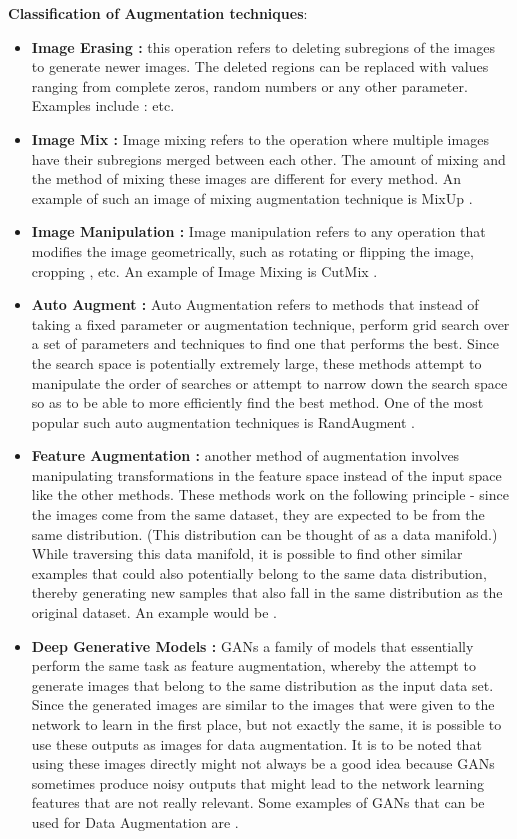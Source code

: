 \textbf{Classification of Augmentation techniques}:
\begin{itemize}
\item \textbf{Image Erasing :} this operation refers to deleting subregions of the images to generate newer images. The deleted regions can be replaced with values ranging from complete zeros, random numbers or any other parameter. Examples include : \cite{zhongRandomErasingData2020,chenGridMaskDataAugmentation2020,singhHideandSeekDataAugmentation2018} etc.
\item \textbf{Image Mix :} Image mixing refers to the operation where multiple images have their subregions merged between each other. The amount of mixing and the method of mixing these images are different for every method. An example of such an image of mixing augmentation technique is MixUp \cite{zhangMixupEmpiricalRisk2018}.
\item \textbf{Image Manipulation :} Image manipulation refers to any operation that modifies the image geometrically, such as rotating or flipping the image, cropping , etc. An example of Image Mixing is CutMix \cite{yunCutMixRegularizationStrategy2019a}.
\item \textbf{Auto Augment :} Auto Augmentation refers to methods that instead of taking a fixed parameter or augmentation technique, perform grid search over a set of parameters and techniques to find one that performs the best. Since the search space is potentially extremely large, these methods attempt to manipulate the order of searches or attempt to narrow down the search space so as to be able to more efficiently find the best method. One of the most popular such auto augmentation techniques is RandAugment \cite{cubukRandaugmentPracticalAutomated2020}.
\item \textbf{Feature Augmentation :} another method of augmentation involves manipulating transformations in the feature space instead of the input space like the other methods. These methods work on the following principle - since the images come from the same dataset, they are expected to be from the same distribution. (This distribution can be thought of as a data manifold.) While traversing this data manifold, it is possible to find other similar examples that could also potentially belong to the same data distribution, thereby generating new samples that also fall in the same distribution as the original dataset. An example would be \cite{devriesImprovedRegularizationConvolutional2017}.
\item \textbf{Deep Generative Models :} GANs a family of models that essentially perform the same task as feature augmentation, whereby the attempt to generate images that belong to the same distribution as the input data set. Since the generated images are similar to the images that were given to the network to learn in the first place, but not exactly the same, it is possible to use these outputs as images for data augmentation. It is to be noted that using these images directly might not always be a good idea because GANs sometimes produce noisy outputs that might lead to the network learning features that are not really relevant. Some examples of GANs that can be used for Data Augmentation are \cite{choiStarGANV2Diverse2020,isolaImagetoImageTranslationConditional2018}.

\end{itemize}
